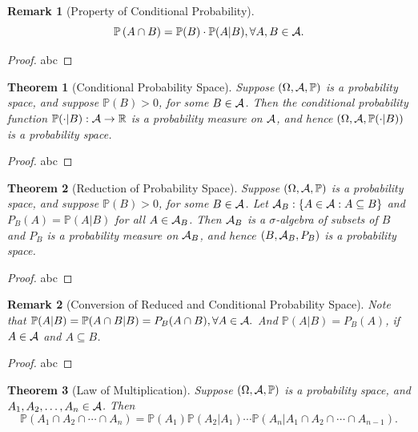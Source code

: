 \documentclass[openany,12pt]{book}
\newtheorem{theorem}{Theorem}[chapter]
\newtheorem{remark}{Remark}[chapter]
\begin{document}
\begin{remark}[Property of Conditional Probability]
  $$\mathbb{P}\left(A\cap B\right)=\mathbb{P}(B)\cdot \mathbb{P}(A|B),\forall A,B\in\mathcal{A}.$$
\end{remark}

\begin{proof}
  abc
\end{proof}

\begin{theorem}[Conditional Probability Space]
  Suppose $(\Omega,\mathcal{A},\mathbb{P})$ is a probability space, and suppose $\mathbb{P}(B)>0$, for some $B\in\mathcal{A}$.
  Then the conditional probability function $\mathbb{P}(\cdot|B): \mathcal{A}\to\mathbb{R}$ is a probability measure on $\mathcal{A}$, and hence $(\Omega,\mathcal{A}, \mathbb{P}(\cdot|B))$ is a probability space.
\end{theorem}

\begin{proof}
  abc
\end{proof}

\begin{theorem}[Reduction of Probability Space]
  Suppose $(\Omega,\mathcal{A},\mathbb{P})$ is a probability space, and suppose $\mathbb{P}(B)>0$, for some $B\in\mathcal{A}$. Let $\mathcal{A}_B:\{A\in\mathcal{A}: A\subseteq B\}$ and $P_B (A)=\mathbb{P}(A|B)$  for all $A\in\mathcal{A}_B$.  Then $\mathcal{A}_B$ is a $\sigma$-algebra of subsets of $B$ and $P_B$ is a probability measure on $\mathcal{A}_B$, and hence $(B,\mathcal{A}_B,P_B)$ is a probability space.
\end{theorem}

\begin{proof}
  abc
\end{proof}

\begin{remark}[Conversion of Reduced and Conditional Probability Space]
  Note that $\mathbb{P}(A|B)=\mathbb{P}(A\cap B|B)=P_B (A\cap B),\forall A\in\mathcal{A}.$
  And $\mathbb{P}(A|B)=P_B (A)$, if $A\in\mathcal{A}$ and $A\subseteq B$.
\end{remark}

\begin{proof}
  abc
\end{proof}

\begin{theorem}[Law of Multiplication]
  Suppose $(\Omega,\mathcal{A},\mathbb{P})$ is a probability space, and $A_1,A_2,\dots,A_n\in\mathcal{A}$. Then $$\mathbb{P}\left(A_1\cap A_2\cap\cdots\cap A_n\right)=\mathbb{P}(A_1)\mathbb{P}(A_2|A_1)\cdots \mathbb{P}\left(A_n|A_1 \cap A_2\cap\cdots\cap A_{n-1}\right).$$
\end{theorem}
\end{document}
